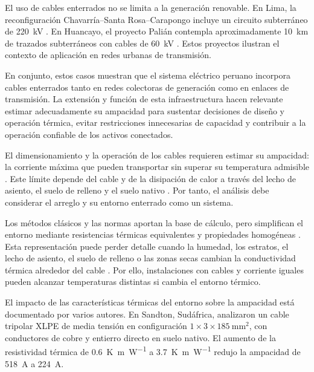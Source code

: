 El uso de cables enterrados no se limita a la generación renovable. En Lima, la reconfiguración Chavarría--Santa Rosa--Carapongo incluye un circuito subterráneo de \SI{220}{\kilo\volt} \parencite[13]{coes2022planTransmision2023_2032}. En Huancayo, el proyecto Palián contempla aproximadamente \SI{10}{\kilo\metre} de trazados subterráneos con cables de \SI{60}{\kilo\volt} \parencites[168]{coes2022planTransmision2023_2032}[3,55--56]{proinversion2026palian}. Estos proyectos ilustran el contexto de aplicación en redes urbanas de transmisión.

En conjunto, estos casos muestran que el sistema eléctrico peruano incorpora cables enterrados tanto en redes colectoras de generación como en enlaces de transmisión. La extensión y función de esta infraestructura hacen relevante estimar adecuadamente su ampacidad para sustentar decisiones de diseño y operación térmica, evitar restricciones innecesarias de capacidad y contribuir a la operación confiable de los activos conectados.

El dimensionamiento y la operación de los cables requieren estimar su ampacidad: la corriente máxima que pueden transportar sin superar su temperatura admisible \parencite{iec60287}. Este límite depende del cable y de la disipación de calor a través del lecho de asiento, el suelo de relleno y el suelo nativo \parencites{fariz2026}{mobius2025}. Por tanto, el análisis debe considerar el arreglo y su entorno enterrado como un sistema.

Los métodos clásicos y las normas aportan la base de cálculo, pero simplifican el entorno mediante resistencias térmicas equivalentes y propiedades homogéneas \parencites[752--760]{neher1957}{iec60287}{iec60853}. Esta representación puede perder detalle cuando la humedad, los estratos, el lecho de asiento, el suelo de relleno o las zonas secas cambian la conductividad térmica alrededor del cable \parencites[4--6]{enescu2021}[1--3]{aldulaimi2024}. Por ello, instalaciones con cables y corriente iguales pueden alcanzar temperaturas distintas si cambia el entorno térmico.

El impacto de las características térmicas del entorno sobre la ampacidad está documentado por varios autores. En Sandton, Sudáfrica, \textcite[5--6, tabs.~2--3]{khumalo2025} analizaron un cable tripolar XLPE de media tensión en configuración $1\times3\times\SI{185}{\milli\metre\squared}$, con conductores de cobre y entierro directo en suelo nativo. El aumento de la resistividad térmica de \SI{0.6}{\kelvin\metre\per\watt} a \SI{3.7}{\kelvin\metre\per\watt} redujo la ampacidad de \SI{518}{\ampere} a \SI{224}{\ampere}.

